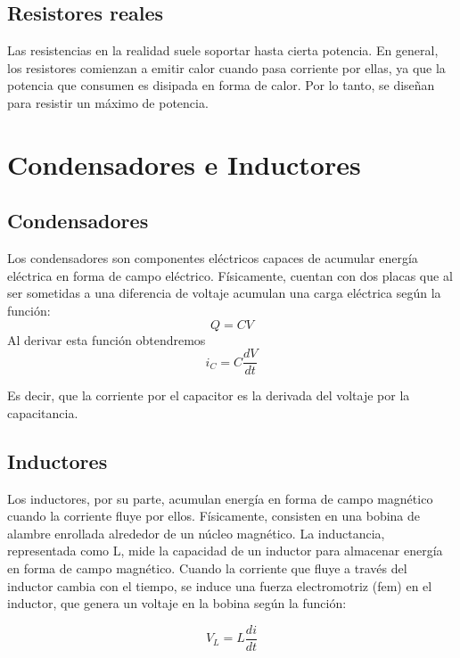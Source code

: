 \subsection{Resistores reales}

Las resistencias en la realidad suele soportar hasta cierta potencia. En general, los resistores comienzan a emitir calor cuando pasa corriente por ellas, ya que la potencia que consumen es disipada en forma de calor. Por lo tanto, se diseñan para resistir un máximo de potencia.

\newpage


\section{Condensadores e Inductores}
\subsection{Condensadores}
Los condensadores son componentes eléctricos capaces de acumular energía eléctrica en forma de campo eléctrico. Físicamente, cuentan con dos placas que al ser sometidas a una diferencia de voltaje acumulan una carga eléctrica según la función:
\begin {equation*}
    Q=CV
\end {equation*}
Al derivar esta función obtendremos
\begin {equation*}
    i_C=C\frac{dV}{dt}
\end {equation*}

Es decir, que la corriente por el capacitor es la derivada del voltaje por la capacitancia.

\subsection{Inductores}
Los inductores, por su parte, acumulan energía en forma de campo magnético cuando la corriente fluye por ellos. Físicamente, consisten en una bobina de alambre enrollada alrededor de un núcleo magnético. La inductancia, representada como L, mide la capacidad de un inductor para almacenar energía en forma de campo magnético. Cuando la corriente que fluye a través del inductor cambia con el tiempo, se induce una fuerza electromotriz (fem) en el inductor, que genera un voltaje en la bobina según la función:

\begin{equation*}
    V_L = L \frac{di}{dt}
\end{equation*}

